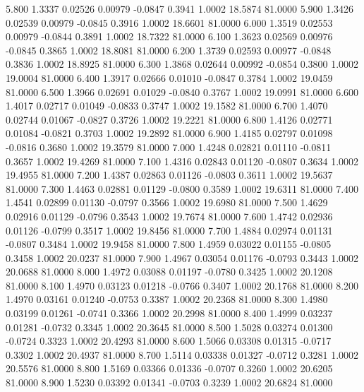    5.800   1.3337   0.02526   0.00979  -0.0847   0.3941   1.0002  18.5874  81.0000
   5.900   1.3426   0.02539   0.00979  -0.0845   0.3916   1.0002  18.6601  81.0000
   6.000   1.3519   0.02553   0.00979  -0.0844   0.3891   1.0002  18.7322  81.0000
   6.100   1.3623   0.02569   0.00976  -0.0845   0.3865   1.0002  18.8081  81.0000
   6.200   1.3739   0.02593   0.00977  -0.0848   0.3836   1.0002  18.8925  81.0000
   6.300   1.3868   0.02644   0.00992  -0.0854   0.3800   1.0002  19.0004  81.0000
   6.400   1.3917   0.02666   0.01010  -0.0847   0.3784   1.0002  19.0459  81.0000
   6.500   1.3966   0.02691   0.01029  -0.0840   0.3767   1.0002  19.0991  81.0000
   6.600   1.4017   0.02717   0.01049  -0.0833   0.3747   1.0002  19.1582  81.0000
   6.700   1.4070   0.02744   0.01067  -0.0827   0.3726   1.0002  19.2221  81.0000
   6.800   1.4126   0.02771   0.01084  -0.0821   0.3703   1.0002  19.2892  81.0000
   6.900   1.4185   0.02797   0.01098  -0.0816   0.3680   1.0002  19.3579  81.0000
   7.000   1.4248   0.02821   0.01110  -0.0811   0.3657   1.0002  19.4269  81.0000
   7.100   1.4316   0.02843   0.01120  -0.0807   0.3634   1.0002  19.4955  81.0000
   7.200   1.4387   0.02863   0.01126  -0.0803   0.3611   1.0002  19.5637  81.0000
   7.300   1.4463   0.02881   0.01129  -0.0800   0.3589   1.0002  19.6311  81.0000
   7.400   1.4541   0.02899   0.01130  -0.0797   0.3566   1.0002  19.6980  81.0000
   7.500   1.4629   0.02916   0.01129  -0.0796   0.3543   1.0002  19.7674  81.0000
   7.600   1.4742   0.02936   0.01126  -0.0799   0.3517   1.0002  19.8456  81.0000
   7.700   1.4884   0.02974   0.01131  -0.0807   0.3484   1.0002  19.9458  81.0000
   7.800   1.4959   0.03022   0.01155  -0.0805   0.3458   1.0002  20.0237  81.0000
   7.900   1.4967   0.03054   0.01176  -0.0793   0.3443   1.0002  20.0688  81.0000
   8.000   1.4972   0.03088   0.01197  -0.0780   0.3425   1.0002  20.1208  81.0000
   8.100   1.4970   0.03123   0.01218  -0.0766   0.3407   1.0002  20.1768  81.0000
   8.200   1.4970   0.03161   0.01240  -0.0753   0.3387   1.0002  20.2368  81.0000
   8.300   1.4980   0.03199   0.01261  -0.0741   0.3366   1.0002  20.2998  81.0000
   8.400   1.4999   0.03237   0.01281  -0.0732   0.3345   1.0002  20.3645  81.0000
   8.500   1.5028   0.03274   0.01300  -0.0724   0.3323   1.0002  20.4293  81.0000
   8.600   1.5066   0.03308   0.01315  -0.0717   0.3302   1.0002  20.4937  81.0000
   8.700   1.5114   0.03338   0.01327  -0.0712   0.3281   1.0002  20.5576  81.0000
   8.800   1.5169   0.03366   0.01336  -0.0707   0.3260   1.0002  20.6205  81.0000
   8.900   1.5230   0.03392   0.01341  -0.0703   0.3239   1.0002  20.6824  81.0000
